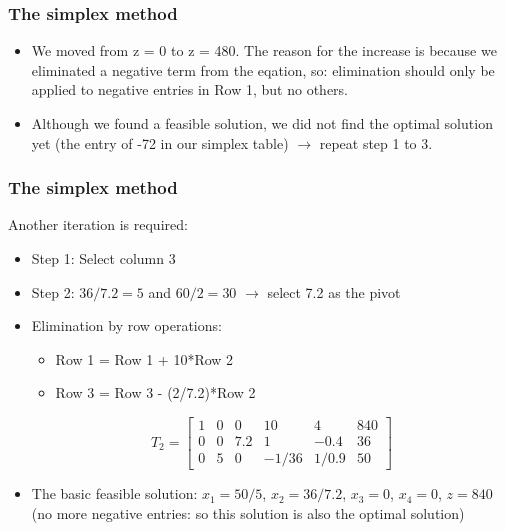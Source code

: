 \begin{frame}
  \frametitle{The simplex method}
  \begin{itemize}
    \item We moved from z = 0 to z = 480. The reason for the increase is because we eliminated a negative term from the eqation, so: elimination should only be applied to negative entries in Row 1, but no others.
    \item Although we found a feasible solution, we did not find the optimal solution yet (the entry of -72 in our simplex table) $\longrightarrow$ repeat step 1 to 3. 
  \end{itemize}
\end{frame}

\begin{frame}
  \frametitle{The simplex method}
  Another iteration is required:
  \begin{itemize}
    \item Step 1: Select column 3
    \item Step 2: $36/7.2 = 5$ and $60/2 = 30$ $\longrightarrow$ select 7.2 as the pivot
    \item Elimination by row operations:
    \begin{itemize}
      \item Row 1 = Row 1 + 10*Row 2
      \item Row 3 = Row 3 - (2/7.2)*Row 2
    \end{itemize}
       \[
T_2 = \begin{bmatrix}
1 & 0 & 0 & 10 & 4 & 840\\ 
0 & 0 & 7.2 & 1 & -0.4 & 36\\
0 & 5 & 0 & -1/36 & 1/0.9 &50 
\end{bmatrix}
   \]
    \item The basic feasible solution: $x_1 = 50/5$, $x_2 = 36/7.2$, $x_3 = 0$, $x_4 = 0$, $z=840$ (no more negative entries: so this solution is also the optimal solution)
  \end{itemize}
\end{frame}

